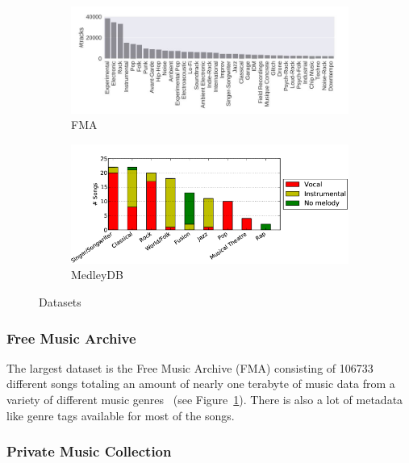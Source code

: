 \begin{figure}[htbp]
{{	\begin{subfigure}{0.5\textwidth}
		\centering
		\includegraphics[scale=0.35]{Images/fma_genre.JPG}
		\caption{FMA \cite[p. 4]{fma1}}
		\label{fmadist}
	\end{subfigure}
	\begin{subfigure}{0.5\textwidth}
		\centering
		\includegraphics[scale=0.35]{Images/MedleyDB1.png}
		\caption{MedleyDB \cite[p. 2]{medleydb1}}
		\label{medleydbdist}
	\end{subfigure}
	}}
	\caption{Datasets}
	\label{fig:datasetdist}
\end{figure}
\FloatBarrier

\subsubsection{Free Music Archive}

The largest dataset is the Free Music Archive (FMA) consisting of 106733 different songs totaling an amount of nearly one terabyte of music data from a variety of different music genres~\cite{fma1} (see Figure~\ref{fmadist}). There is also a lot of metadata like genre tags available for most of the songs.

\subsubsection{Private Music Collection}

